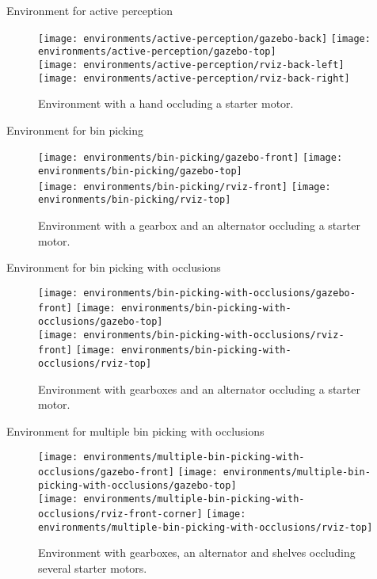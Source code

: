 \begin{frame}{Environment for active perception}
	\begin{figure}
		\centering
		\texttt{[image: environments/active-perception/gazebo-back]}
		\texttt{[image: environments/active-perception/gazebo-top]}\\
		\texttt{[image: environments/active-perception/rviz-back-left]}
		\texttt{[image: environments/active-perception/rviz-back-right]}
		\caption{Environment with a hand occluding a starter motor.}
	\end{figure}
\end{frame}


\begin{frame}{Environment for bin picking}
	\begin{figure}
		\centering
		\texttt{[image: environments/bin-picking/gazebo-front]}
		\texttt{[image: environments/bin-picking/gazebo-top]}\\
		\texttt{[image: environments/bin-picking/rviz-front]}
		\texttt{[image: environments/bin-picking/rviz-top]}
		\caption{Environment with a gearbox and an alternator occluding a starter motor.}
	\end{figure}
\end{frame}


\begin{frame}{Environment for bin picking with occlusions}
	\begin{figure}
		\centering
		\texttt{[image: environments/bin-picking-with-occlusions/gazebo-front]}
		\texttt{[image: environments/bin-picking-with-occlusions/gazebo-top]}\\
		\texttt{[image: environments/bin-picking-with-occlusions/rviz-front]}
		\texttt{[image: environments/bin-picking-with-occlusions/rviz-top]}
		\caption{Environment with gearboxes and an alternator occluding a starter motor.}
	\end{figure}
\end{frame}


\begin{frame}{Environment for multiple bin picking with occlusions}
	\begin{figure}
		\centering
		\texttt{[image: environments/multiple-bin-picking-with-occlusions/gazebo-front]}
		\texttt{[image: environments/multiple-bin-picking-with-occlusions/gazebo-top]}\\
		\texttt{[image: environments/multiple-bin-picking-with-occlusions/rviz-front-corner]}
		\texttt{[image: environments/multiple-bin-picking-with-occlusions/rviz-top]}
		\caption{Environment with gearboxes, an alternator and shelves occluding several starter motors.}
	\end{figure}
\end{frame}
